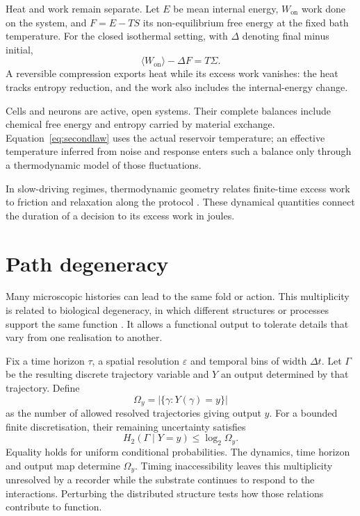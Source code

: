 \documentclass[10pt,a4paper,twocolumn]{article}
\numberwithin{equation}{section}
\begin{document}
Heat and work remain separate. Let $E$ be mean internal energy, $W_{\mathrm{on}}$ work done on the system, and $F=E-TS$ its non-equilibrium free energy at the fixed bath temperature. For the closed isothermal setting, with $\Delta$ denoting final minus initial,
\begin{equation}
\langle W_{\mathrm{on}}\rangle-\Delta F=T\Sigma .
\label{eq:work}
\end{equation}
A reversible compression exports heat while its excess work vanishes: the heat tracks entropy reduction, and the work also includes the internal-energy change.

Cells and neurons are active, open systems. Their complete balances include chemical free energy and entropy carried by material exchange. Equation~\eqref{eq:secondlaw} uses the actual reservoir temperature; an effective temperature inferred from noise and response enters such a balance only through a thermodynamic model of those fluctuations.

In slow-driving regimes, thermodynamic geometry relates finite-time excess work to friction and relaxation along the protocol \cite{sivak2012}. These dynamical quantities connect the duration of a decision to its excess work in joules.

\section{Path degeneracy}

Many microscopic histories can lead to the same fold or action. This multiplicity is related to biological degeneracy, in which different structures or processes support the same function \cite{edelman2001}. It allows a functional output to tolerate details that vary from one realisation to another.

Fix a time horizon $\tau$, a spatial resolution $\varepsilon$ and temporal bins of width $\Delta t$. Let $\Gamma$ be the resulting discrete trajectory variable and $Y$ an output determined by that trajectory. Define
\begin{equation}
\Omega_y=\bigl|\{\gamma:Y(\gamma)=y\}\bigr|
\end{equation}
as the number of allowed resolved trajectories giving output $y$. For a bounded finite discretisation, their remaining uncertainty satisfies
\begin{equation}
H_2(\Gamma\mid Y=y)\leq\log_2\Omega_y .
\label{eq:paths}
\end{equation}
Equality holds for uniform conditional probabilities. The dynamics, time horizon and output map determine $\Omega_y$. Timing inaccessibility leaves this multiplicity unresolved by a recorder while the substrate continues to respond to the interactions. Perturbing the distributed structure tests how those relations contribute to function.
\end{document}
